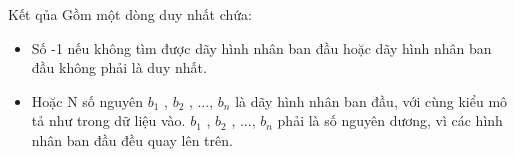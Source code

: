 Kết qủa  
Gồm một dòng duy nhất chứa:  
\begin{itemize}
	\item     Số -1 nếu không tìm được dãy hình nhân ban đầu hoặc dãy hình nhân ban đầu không phải là duy nhất.   
	\item     Hoặc N số nguyên $b_{1}$    , $b_{2}$    , ..., $b_{n}$    là dãy hình nhân ban đầu, với cùng kiểu mô tả như trong dữ liệu vào. $b_{1}$    , $b_{2}$    , ..., $b_{n}$    phải là số nguyên dương, vì các hình nhân ban đầu đều quay lên trên.   
\end{itemize}